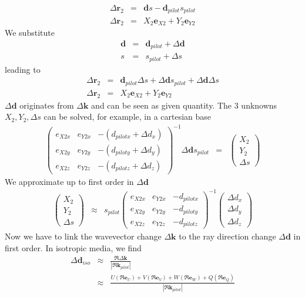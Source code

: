 \documentclass[12pt,a4paper,twoside,openright,BCOR10mm,headsepline,titlepage,abstracton,chapterprefix,final]{scrreprt}
\newcommand\Vector[1]{{\mathbf{#1}}}
\newcommand\wavenumber{k}
\newcommand\Wavevector{\Vector{\wavenumber}}
\begin{document}
\begin{eqnarray}
  \Delta \Vector{r}_2  &=& \Vector{d} s - \Vector{d}_{pilot} s_{pilot} \\
  \Delta \Vector{r}_2  &=& X_2 \Vector{e}_{X2} + Y_2 \Vector{e}_{Y2}
\end{eqnarray}
We substitute
\begin{eqnarray}
 \Vector{d} &=& \Vector{d}_{pilot} + \Delta \Vector{d} \\
 s &=& s_{pilot} + \Delta s
\end{eqnarray}
leading to
\begin{eqnarray}
  \Delta \Vector{r}_2  &=& \Vector{d}_{pilot} \Delta s + \Delta \Vector{d} s_{pilot} + \Delta \Vector{d} \Delta s \\
  \Delta \Vector{r}_2  &=& X_2 \Vector{e}_{X2} + Y_2 \Vector{e}_{Y2}
\end{eqnarray}
$\Delta \Vector{d}$ originates from $\Delta \Wavevector$ and can be seen as given quantity.
The 3 unknowns $X_2 , Y_2 , \Delta s$ can be solved, for example, in a cartesian base
\begin{eqnarray}
 \begin{pmatrix}
  e_{X2x} & e_{Y2x} & - ( d_{pilotx} + \Delta d_x ) \\
  e_{X2y} & e_{Y2y} & - ( d_{piloty} + \Delta d_y ) \\
  e_{X2z} & e_{Y2z} & - ( d_{pilotz} + \Delta d_z ) 
 \end{pmatrix}^{-1}
 \Delta \Vector{d} s_{pilot} &=& 
 \begin{pmatrix}
  X_2 \\ Y_2 \\ \Delta s
 \end{pmatrix} 
\end{eqnarray}
We approximate up to first order in $\Delta \Vector{d}$
\begin{eqnarray}
 \begin{pmatrix}
  X_2 \\ Y_2 \\ \Delta s
 \end{pmatrix} 
 &\approx& s_{pilot}
 \begin{pmatrix}
  e_{X2x} & e_{Y2x} & - d_{pilotx} \\
  e_{X2y} & e_{Y2y} & - d_{piloty} \\
  e_{X2z} & e_{Y2z} & - d_{pilotz} 
 \end{pmatrix}^{-1}
 \begin{pmatrix}
  \Delta d_x \\ \Delta d_y \\ \Delta d_z
 \end{pmatrix}
\end{eqnarray}
Now we have to link the wavevector change $\Delta \Wavevector$ to the ray direction change $\Delta \Vector{d}$ in first order.
In isotropic media, we find
\begin{eqnarray}
 \Delta \Vector{d}_{iso} 
 &\approx& \frac{\Re \Delta \Wavevector}{|\Re \Wavevector_{pilot}|}
 \\
 &\approx&
  \frac{
    U(\Re \Vector{e}_U)
    + V(\Re \Vector{e}_V)
    + W(\Re \Vector{e}_W)
    + Q(\Re \Vector{e}_Q)
  }{|\Re \Wavevector_{pilot}|}
\end{eqnarray}
\end{document}
